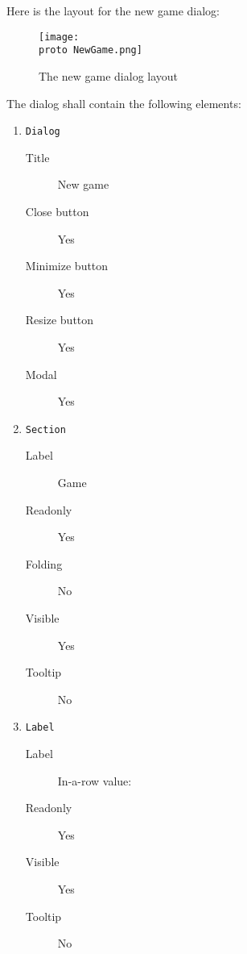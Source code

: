 Here is the layout for the new game dialog:

\begin{figure}[H]
  \texttt{[image: \\proto NewGame.png]}
  \caption{The new game dialog layout}
  \label{fig:NewGameDlgLayout}
\end{figure}

The dialog shall contain the following elements:

\begin{enumerate}

    \item \texttt{Dialog}
              \begin{description}
                  \item[Title] New game
                  \item[Close button] Yes
                  \item[Minimize button] Yes
                  \item[Resize button] Yes
                  \item[Modal] Yes
              \end{description}

    \item \texttt{Section}
              \begin{description}
                  \item[Label] Game
                  \item[Readonly] Yes
                  \item[Folding] No
                  \item[Visible] Yes
                  \item[Tooltip] No
              \end{description}

    \item \texttt{Label}
              \begin{description}
                  \item[Label] In-a-row value:
                  \item[Readonly] Yes
                  \item[Visible] Yes
                  \item[Tooltip] No
              \end{description}


\end{enumerate}
